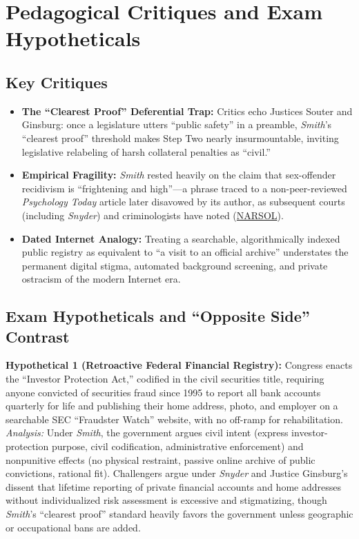 \documentclass[12pt]{article}
\begin{document}
\section{Pedagogical Critiques and Exam Hypotheticals}
\subsection{Key Critiques}
\begin{itemize}
  \item \textbf{The ``Clearest Proof'' Deferential Trap:} Critics echo Justices Souter and Ginsburg: once a legislature utters ``public safety'' in a preamble, \textit{Smith}'s ``clearest proof'' threshold makes Step Two nearly insurmountable, inviting legislative relabeling of harsh collateral penalties as ``civil.''
  \item \textbf{Empirical Fragility:} \textit{Smith} rested heavily on the claim that sex-offender recidivism is ``frightening and high''---a phrase traced to a non-peer-reviewed \textit{Psychology Today} article later disavowed by its author, as subsequent courts (including \textit{Snyder}) and criminologists have noted (\href{https://www.narsol.org/scotus0125/}{NARSOL}).
  \item \textbf{Dated Internet Analogy:} Treating a searchable, algorithmically indexed public registry as equivalent to ``a visit to an official archive'' understates the permanent digital stigma, automated background screening, and private ostracism of the modern Internet era.
\end{itemize}

\subsection{Exam Hypotheticals and ``Opposite Side'' Contrast}
\textbf{Hypothetical 1 (Retroactive Federal Financial Registry):} Congress enacts the ``Investor Protection Act,'' codified in the civil securities title, requiring anyone convicted of securities fraud since 1995 to report all bank accounts quarterly for life and publishing their home address, photo, and employer on a searchable SEC ``Fraudster Watch'' website, with no off-ramp for rehabilitation. \textit{Analysis:} Under \textit{Smith}, the government argues civil intent (express investor-protection purpose, civil codification, administrative enforcement) and nonpunitive effects (no physical restraint, passive online archive of public convictions, rational fit). Challengers argue under \textit{Snyder} and Justice Ginsburg's dissent that lifetime reporting of private financial accounts and home addresses without individualized risk assessment is excessive and stigmatizing, though \textit{Smith}'s ``clearest proof'' standard heavily favors the government unless geographic or occupational bans are added.
\end{document}
